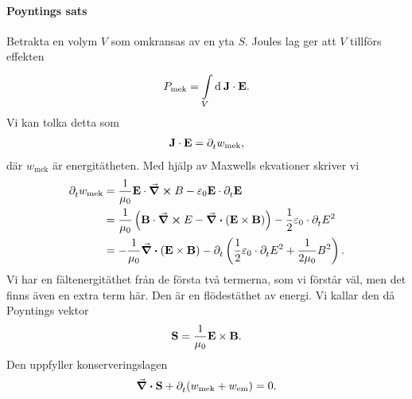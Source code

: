 \paragraph{Poyntings sats}
Betrakta en volym $V$ som omkransas av en yta $S$. Joules lag ger att $V$ tillförs effekten
\begin{align*}
	P_{\text{mek}} = \int\limits_{V}^{}\dd[]{}\vb{J}\cdot\vb{E}.
\end{align*}
Vi kan tolka detta som
\begin{align*}
	\vb{J}\cdot\vb{E} = \partial_{t}^{}w_{\text{mek}},
\end{align*}
där $w_{\text{mek}}$ är energitätheten. Med hjälp av Maxwells ekvationer skriver vi
\begin{align*}
	\partial_{t}^{}w_{\text{mek}} &= \frac{1}{\mu_{0}}\vb{E}\cdot\curl{B} - \varepsilon_{0}\vb{E}\cdot\partial_{t}^{}\vb{E} \\
	                        &= \frac{1}{\mu_{0}}\left(\vb{B}\cdot\curl{E} - \div(\vb{E}\times\vb{B})\right) - \frac{1}{2}\varepsilon_{0}\cdot\partial_{t}^{}E^{2} \\
	                        &= -\frac{1}{\mu_{0}}\div(\vb{E}\times\vb{B}) - \partial_{t}^{}\left(\frac{1}{2}\varepsilon_{0}\cdot\partial_{t}^{}E^{2} + \frac{1}{2\mu_{0}}B^{2}\right).
\end{align*}
Vi har en fältenergitäthet från de första två termerna, som vi förstår väl, men det finns även en extra term här. Den är en flödestäthet av energi. Vi kallar den då Poyntings vektor
\begin{align*}
	\vb{S} = \frac{1}{\mu_{0}}\vb{E}\times\vb{B}.
\end{align*}
Den uppfyller konserveringslagen
\begin{align*}
	\div{\vb{S}} + \partial_{t}^{}(w_{\text{mek}} + w_{\text{em}}) = 0.
\end{align*}

